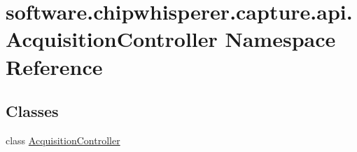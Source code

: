\hypertarget{namespacesoftware_1_1chipwhisperer_1_1capture_1_1api_1_1AcquisitionController}{}\section{software.\+chipwhisperer.\+capture.\+api.\+Acquisition\+Controller Namespace Reference}
\label{namespacesoftware_1_1chipwhisperer_1_1capture_1_1api_1_1AcquisitionController}
\subsection*{Classes}
\begin{DoxyCompactItemize}
\item 
class \hyperlink{classsoftware_1_1chipwhisperer_1_1capture_1_1api_1_1AcquisitionController_1_1AcquisitionController}{Acquisition\+Controller}
\end{DoxyCompactItemize}
